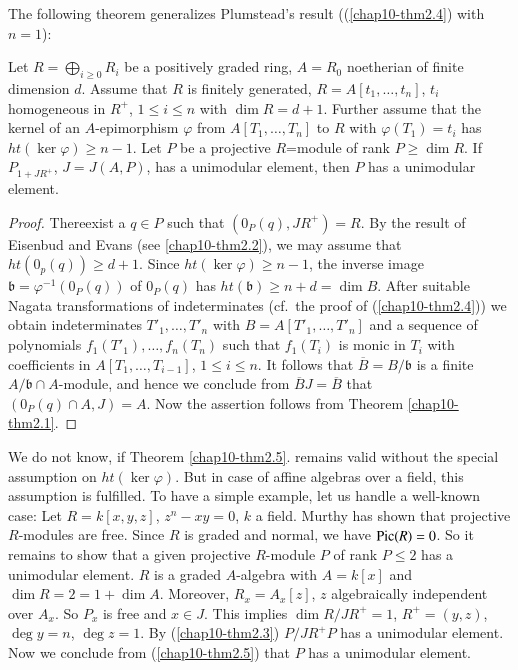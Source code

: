The following theorem generalizes Plumstead's result
((\ref{chap10-thm2.4}) with $n=1$):

\begin{subthm}\label{chap10-thm2.5}
Let $R=\bigoplus\limits_{i\geq 0}R_{i}$ be a positively graded ring,
$A=R_{0}$ noetherian of finite dimension $d$. Assume that $R$ is
finitely generated, $R=A[t_{1},\ldots,t_{n}]$, $t_{i}$ homogeneous in
$R^{+}$, $1\leq i\leq n$ with $\dim R=d+1$. Further assume that the
kernel of an $A$-epimorphism $\varphi$ from $A[T_{1},\ldots,T_{n}]$ to
$R$ with $\varphi(T_{1})=t_{i}$ has $ht(\ker \varphi)\geq n-1$. Let
$P$ be a projective $R$=module of rank $P\geq \dim R$. If
$P_{1+JR^{+}}$, $J=J(A,P)$, has a unimodular element, then $P$ has a
unimodular element. 
\end{subthm}

\begin{proof}
There\pageoriginale exist a $q\in P$ such that
$(0_{P}(q),JR^{+})=R$. By the result of Eisenbud and Evans
(see \ref{chap10-thm2.2}), we may assume that $ht(0_{p}(q))\geq
d+1$. Since $ht(\ker \varphi)\geq n-1$, the inverse image
$\mathfrak{b}=\varphi^{-1}(0_{P}(q))$ of $0_{P}(q)$ has
$ht(\mathfrak{b})\geq n+d=\dim B$. After suitable Nagata
transformations of indeterminates (cf.~the proof of
(\ref{chap10-thm2.4})) we obtain indeterminates $T'_{1},\ldots,T'_{n}$
with $B=A[T'_{1},\ldots,T'_{n}]$ and a sequence of polynomials
$f_{1}(T'_{1}),\ldots,f_{n}(T_{n})$ such that $f_{1}(T_{i})$ is monic
in $T_{i}$ with coefficients in $A[T_{1},\ldots,T_{i-1}]$, $1\leq
i\leq n$. It follows that $\overline{B}=B/\mathfrak{b}$ is a finite
$A/\mathfrak{b}\cap A$-module, and hence we conclude from
$\overline{B}J=\overline{B}$ that $(0_{P}(q)\cap A,J)=A$. Now the
assertion follows from Theorem \ref{chap10-thm2.1}.
\end{proof}

\begin{subremark}\label{chap10-rem2.6}
We do not know, if Theorem \ref{chap10-thm2.5}. remains valid without
the special assumption on $ht(\ker \varphi)$. But in case of affine
algebras over a field, this assumption is fulfilled. To have a simple
example, let us handle a well-known case: Let $R=k[x,y,z]$,
$z^{n}-xy=0$, $k$ a field. Murthy has shown that projective
$R$-modules are free. Since $R$ is graded and normal, we have
$\operatorname{Pic}(R)=0$. So it remains to show that a given projective $R$-module
$P$ of rank $P\leq 2$ has a unimodular element. $R$ is a graded
$A$-algebra with $A=k[x]$ and $\dim R=2=1+\dim A$. Moreover,
$R_{x}=A_{x}[z]$, $z$ algebraically independent over $A_{x}$. So
$P_{x}$ is free and $x\in J$. This implies $\dim R/JR^{+}=1$,
$R^{+}=(y,z)$, $\deg y=n$, $\deg z=1$. By (\ref{chap10-thm2.3})
$P/JR^{+}P$ has a unimodular element. Now we conclude from
(\ref{chap10-thm2.5}) that $P$ has a unimodular element. 
\end{subremark}

